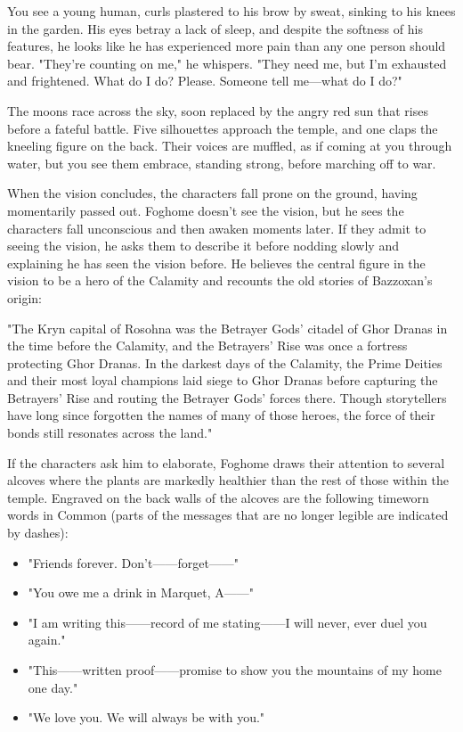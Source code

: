 \documentclass[10pt,a4paper,twoside,twocolumn,openany,nodeprecatedcode]{dndbook}
\begin{document}
\begin{DndReadAloud}{}
You see a young human, curls plastered to his brow by sweat, sinking to his knees in the garden. His eyes betray a lack of sleep, and despite the softness of his features, he looks like he has experienced more pain than any one person should bear. "They're counting on me," he whispers. "They need me, but I'm exhausted and frightened. What do I do? Please. Someone tell me—what do I do?"

The moons race across the sky, soon replaced by the angry red sun that rises before a fateful battle. Five silhouettes approach the temple, and one claps the kneeling figure on the back. Their voices are muffled, as if coming at you through water, but you see them embrace, standing strong, before marching off to war.

\end{DndReadAloud}

When the vision concludes, the characters fall prone on the ground, having momentarily passed out. Foghome doesn't see the vision, but he sees the characters fall unconscious and then awaken moments later. If they admit to seeing the vision, he asks them to describe it before nodding slowly and explaining he has seen the vision before. He believes the central figure in the vision to be a hero of the Calamity and recounts the old stories of Bazzoxan's origin:

\begin{DndReadAloud}{}
"The Kryn capital of Rosohna was the Betrayer Gods' citadel of Ghor Dranas in the time before the Calamity, and the Betrayers' Rise was once a fortress protecting Ghor Dranas. In the darkest days of the Calamity, the Prime Deities and their most loyal champions laid siege to Ghor Dranas before capturing the Betrayers' Rise and routing the Betrayer Gods' forces there. Though storytellers have long since forgotten the names of many of those heroes, the force of their bonds still resonates across the land."

\end{DndReadAloud}

If the characters ask him to elaborate, Foghome draws their attention to several alcoves where the plants are markedly healthier than the rest of those within the temple. Engraved on the back walls of the alcoves are the following timeworn words in Common (parts of the messages that are no longer legible are indicated by dashes):


\begin{itemize}
\item "Friends forever. Don't——forget——"
\item "You owe me a drink in Marquet, A——"
\item "I am writing this——record of me stating——I will never, ever duel you again."
\item "This——written proof——promise to show you the mountains of my home one day."
\item "We love you. We will always be with you."
\end{itemize}
\end{document}
